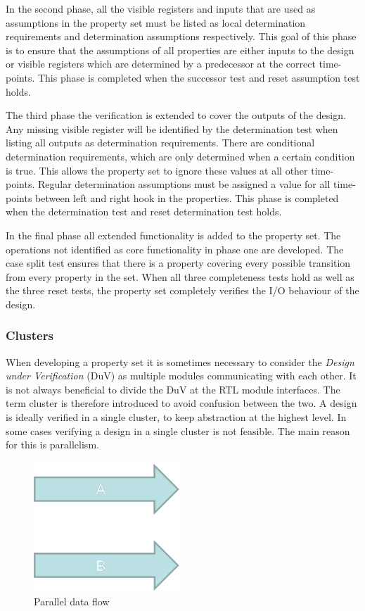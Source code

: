 In the second phase, all the visible registers and inputs that are used as assumptions in the property set must be listed as local determination requirements and determination assumptions respectively. This goal of this phase is to ensure that the assumptions of all properties are either inputs to the design or visible registers which are determined by a predecessor at the correct time-points. This phase is completed when the successor test and reset assumption test holds. \par
The third phase the verification is extended to cover the outputs of the design. Any missing visible register will be identified by the determination test when listing all outputs as determination requirements. There are conditional determination requirements, which are only determined when a certain condition is true. This allows the property set to ignore these values at all other time-points. Regular determination assumptions must be assigned a value for all time-points between left and right hook in the properties. This phase is completed when the determination test and reset determination test holds. \par
In the final phase all extended functionality is added to the property set. The operations not identified as core functionality in phase one are developed. The case split test ensures that there is a property covering every possible transition from every property in the set. When all three completeness tests hold as well as the three reset tests, the property set completely verifies the I/O behaviour of the design.  


\subsubsection{Clusters}
\label{sub:clust}
When developing a property set it is sometimes necessary to consider the \textit{Design under Verification} (DuV) as multiple modules communicating with each other. It is not always beneficial to divide the DuV at the RTL module interfaces. The term cluster is therefore introduced to avoid confusion between the two. A design is ideally verified in a single cluster, to keep abstraction at the highest level. In some cases verifying a design in a single cluster is not feasible. The main reason for this is parallelism.\\ 
\begin{figure}
\includegraphics[width=5.5cm]{figs/Verif/parallell.png}
\caption{Parallel data flow}\label{fig:para}
\end{figure} 

